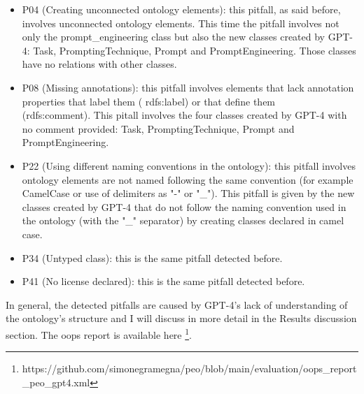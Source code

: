 \begin{itemize}
    \item P04 (Creating unconnected ontology elements): this pitfall, as said before, involves unconnected ontology elements. This time the pitfall involves not only the prompt\_engineering class but also the new classes created by GPT-4: Task, PromptingTechnique, Prompt and PromptEngineering. Those classes have no relations with other classes.

    \item P08 (Missing annotations): this pitfall involves elements that lack annotation properties that label them ( rdfs:label) or that define them\\ (rdfs:comment). This pitall involves the four classes created by GPT-4 with no comment provided: Task, PromptingTechnique, Prompt and PromptEngineering.  

    \item P22 (Using different naming conventions in the ontology): this pitfall involves ontology elements are not named following the same convention (for example CamelCase or use of delimiters as "-" or "\_"). This pitfall is given by the new classes created by GPT-4 that do not follow the naming convention used in the ontology (with the "\_" separator) by creating classes declared in camel case.

    \item P34 (Untyped class): this is the same pitfall detected before.

    \item P41 (No license declared): this is the same pitfall detected before.
\end{itemize}
In general, the detected pitfalls are caused by GPT-4's lack of understanding of the ontology's structure and I will discuss in more detail in the Results discussion section. The oops report is available here \footnote{https://github.com/simonegramegna/peo/blob/main/evaluation/oops_report_peo_gpt4.xml}.


